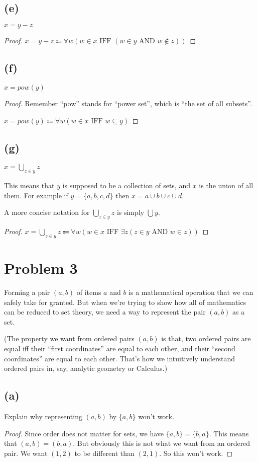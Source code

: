 \documentclass[14pt]{extarticle}
\begin{document}
\subsection{(e)}
$x = y - z$
\begin{proof}
$x = y - z \Coloneqq \forall w (w \in x \text{ IFF } (w \in y \text{ AND } w \notin z))$
\end{proof}

\subsection{(f)}
$x = pow(y)$
\begin{proof}
Remember ``pow'' stands for ``power set'', which is ``the set of all subsets''.

$x = pow(y) \Coloneqq \forall w (w \in x \text{ IFF } w \subseteq y)$
\end{proof}

\subsection{(g)}
$x = \bigcup_{z \in y} z$

This means that $y$ is supposed to be a collection of sets, and $x$ is the union of all them. For example if $y = \{a, b, c, d\}$ then $x = a \cup b \cup c \cup d$. 

A more concise notation for $\bigcup_{z \in y} z$ is simply $\bigcup y$.
\begin{proof}
$x = \bigcup_{z \in y} z \Coloneqq \forall w (w \in x \text{ IFF } \exists z (z \in y \text{ AND } w \in z))$
\end{proof}

\section{Problem 3}
Forming a pair $(a, b)$ of items $a$ and $b$ is a mathematical operation that we can safely take for granted. But when we’re trying to show how all of mathematics can be reduced to set theory, we need a way to represent the pair $(a, b)$ as a set.

(The property we want from ordered pairs $(a, b)$ is that, two ordered pairs are equal iff their ``first coordinates'' are equal to each other, and their ``second coordinates'' are equal to each other. That's how we intuitively understand ordered pairs in, say, analytic geometry or Calculus.)

\subsection{(a)}
Explain why representing $(a, b)$ by $\{a, b\}$ won’t work.
\begin{proof}
Since order does not matter for sets, we have $\{a, b\} = \{b, a\}$. This means that $(a, b) = (b, a)$. But obviously this is not what we want from an ordered pair. We want $(1, 2)$ to be different than $(2, 1)$. So this won't work.
\end{proof}
\end{document}
